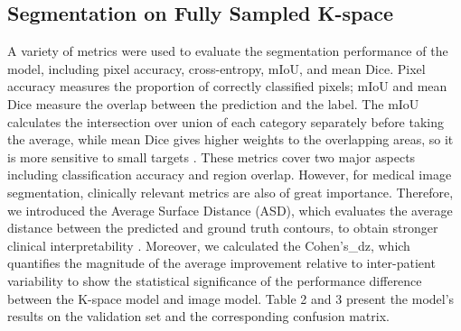 \documentclass[12pt,a4paper]{article}
\begin{document}
\subsection{Segmentation on Fully Sampled K-space}
A variety of metrics were used to evaluate the segmentation performance of the model, including pixel accuracy, cross-entropy, mIoU, and mean Dice. Pixel accuracy measures the proportion of correctly classified pixels; mIoU and mean Dice measure the overlap between the prediction and the label. The mIoU calculates the intersection over union of each category separately before taking the average, while mean Dice gives higher weights to the overlapping areas, so it is more sensitive to small targets \cite{26}. These metrics cover two major aspects including classification accuracy and region overlap. However, for medical image segmentation, clinically relevant metrics are also of great importance. Therefore, we introduced the Average Surface Distance (ASD), which evaluates the average distance between the predicted and ground truth contours, to obtain stronger clinical interpretability \cite{27}. Moreover, we calculated the Cohen's\_dz, which quantifies the magnitude of the average improvement relative to inter-patient variability to show the statistical significance of the performance difference between the K-space model and image model. Table 2 and 3 present the model’s results on the validation set and the corresponding confusion matrix. 
\end{document}
